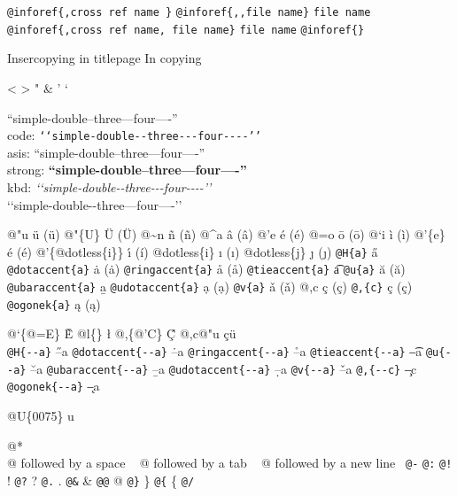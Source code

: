 \documentclass{book}
\newcommand\Texinfocommandstyletextkbd[1]{{\ttfamily\textsl{#1}}}%
\renewcommand{\_}{\Texinfounderscore\discretionary{}{}{}}
\begin{document}
\begin{titlepage}
\texttt{@inforef\{,cross ref name \}} 
\texttt{@inforef\{{,}{,}file name\}} \texttt{file name}
\texttt{@inforef\{,cross ref name,\ file name\}} \texttt{file name}
\texttt{@inforef\{\}} 



Insercopying in titlepage
In copying

<
>
"
\&
'
`

``simple-double--three---four----''\leavevmode{}\\
code: \texttt{{`}{`}simple-double{-}{-}three{-}{-}{-}four{-}{-}{-}-{'}{'}} \leavevmode{}\\
asis: ``simple-double--three---four----'' \leavevmode{}\\
strong: \textbf{``simple-double--three---four----''} \leavevmode{}\\
kbd: \Texinfocommandstyletextkbd{{`}{`}simple-double{-}{-}three{-}{-}{-}four{-}{-}{-}-{'}{'}} \leavevmode{}\\

`\hbox{}`simple-double-\hbox{}-three---four----'\hbox{}'\leavevmode{}\\

%
%
%
%

@"u \"{u} (ü)
@"\{U\} \"{U} (Ü) 
@\~{}n \~{n} (ñ)
@\^{}a \^{a} (â)
@'e \'{e} (é)
@=o \={o} (ō)
@`i \`{i} (ì)
@'\{e\} \'{e} (é)
@'\{@dotless\{i\}\} \'{\i{}} (í)
@dotless\{i\} \i{} (ı)
@dotless\{j\} \j{} (ȷ)
\texttt{@H\{a\}} \H{a}
\texttt{@dotaccent\{a\}} \.{a} (ȧ)
\texttt{@ringaccent\{a\}} \r{a} (å)
\texttt{@tieaccent\{a\}} \t{a}
\texttt{@u\{a\}} \u{a} (ă)
\texttt{@ubaraccent\{a\}} \b{a}
\texttt{@udotaccent\{a\}} \d{a} (ạ)
\texttt{@v\{a\}} \v{a} (ǎ)
@,c \c{c} (ç)
\texttt{@,\{c\}} \c{c} (ç)
\texttt{@ogonek\{a\}} \k{a} (ą)

@`\{@=E\} \`{\={E}}
@l\{\} \l{}
@,\{@'C\} \c{\'{C}}
@,c@"u \c{c}\"{u} \leavevmode{}\\

\texttt{@H\{{-}{-}a\}} \H{--a}
\texttt{@dotaccent\{{-}{-}a\}} \.{--a}
\texttt{@ringaccent\{{-}{-}a\}} \r{--a}
\texttt{@tieaccent\{{-}{-}a\}} \t{--a}
\texttt{@u\{{-}{-}a\}} \u{--a}
\texttt{@ubaraccent\{{-}{-}a\}} \b{--a}
\texttt{@udotaccent\{{-}{-}a\}} \d{--a}
\texttt{@v\{{-}{-}a\}} \v{--a}
\texttt{@,\{{-}{-}c\}} \c{--c}
\texttt{@ogonek\{{-}{-}a\}} \k{--a}

@U\{0075\} u

@* \leavevmode{}\\
@ followed by a space
\ {}
@ followed by a tab
\ {}
@ followed by a new line
\ {}\texttt{@-} \-{}
\texttt{@:} \@
\texttt{@!} \@!
\texttt{@?} \@?
\texttt{@.} \@.
\texttt{@\&} \&
\texttt{@@} @
\texttt{@\}} \}
\texttt{@\{} \{
\texttt{@/} 


\end{titlepage}
\end{document}
